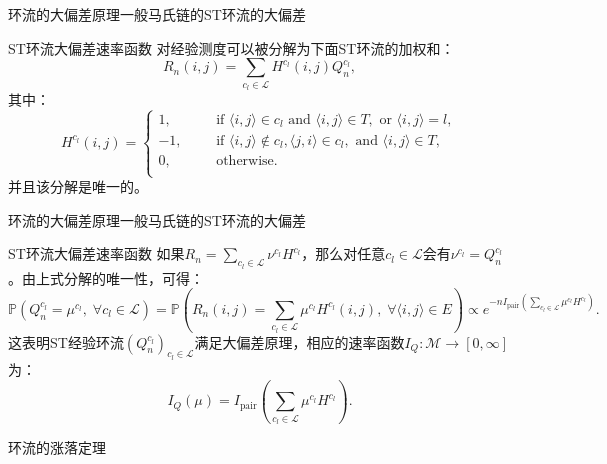\documentclass{beamer}
\begin{document}
\begin{frame}{环流的大偏差原理}{一般马氏链的ST环流的大偏差}
	\begin{block}{ST环流大偏差速率函数}
		对经验测度可以被分解为下面ST环流的加权和：
		\begin{equation*}
			R_n(i,j) = \sum_{c_l\in\mathcal{L}}H^{c_l}(i,j)Q^{c_l}_n,
		\end{equation*}
		其中：
		\begin{equation*}\label{cycle function2}
			H^{c_l}(i,j)
			=\left\{\begin{aligned}
				1,  &  &  & \text{if } \langle i,j\rangle \in c_l \text{ and }\langle i,j\rangle \in T, \text{ or } \langle i,j\rangle=l, \\
				-1, &  &  & \text{if } \langle i,j\rangle\notin c_l,\langle j,i\rangle \in c_l,\text{ and }\langle i,j\rangle \in T,      \\
				0,  &  &  & \text{otherwise}.                                                                                             \\
			\end{aligned}\right.
		\end{equation*}
		并且该分解是唯一的。
	\end{block}
\end{frame}

\begin{frame}{环流的大偏差原理}{一般马氏链的ST环流的大偏差}
	\begin{block}{ST环流大偏差速率函数}
		如果$R_n =\sum_{c_l \in \mathcal{L}}\nu^{c_l}H^{c_l}$，那么对任意$c_l \in \mathcal{L}$会有$\nu^{c_l}=Q_n^{c_l}$。由上式分解的唯一性，可得：
		{\footnotesize
		\begin{equation*}
			\mathbb{P}(Q_n^{c_l}=\mu^{c_l},\;\forall c_l\in\mathcal{L})
			=\mathbb{P}\left(R_n(i,j)=\sum_{c_l\in\mathcal{L}}\mu^{c_l}H^{c_l}(i,j),\;\forall\langle i,j\rangle\in E\right)
			\propto e^{-n I_{\mathrm{pair}}\left(\sum_{c_l\in\mathcal{L}}\mu^{c_l}H^{c_l}\right)}.
		\end{equation*}}
		这表明ST经验环流$(Q_n^{c_l})_{c_l\in\mathcal{L}}$满足大偏差原理，相应的速率函数$I_Q:\mathcal{M}\rightarrow[0,\infty]$为：
		\begin{equation*}\label{formula:I_Q}
			I_Q(\mu)=I_{\mathrm{pair}}\left(\sum_{c_l\in\mathcal{L}}\mu^{c_l}H^{c_l}\right).
		\end{equation*}
	\end{block}
\end{frame}

\begin{frame}
	\begin{center}
		\Huge 环流的涨落定理
	\end{center}
\end{frame}
\end{document}

